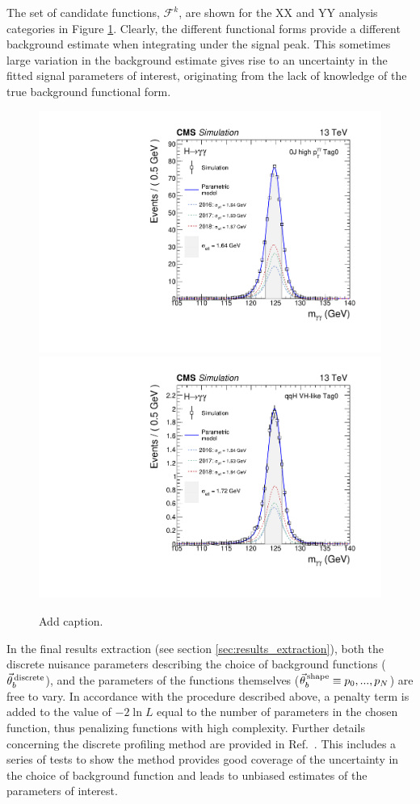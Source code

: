 The set of candidate functions, $\mathcal{F}^k$, are shown for the XX and YY analysis categories in Figure \ref{fig:bkgmodels_category}. Clearly, the different functional forms provide a different background estimate when integrating under the signal peak. This sometimes large variation in the background estimate gives rise to an uncertainty in the fitted signal parameters of interest, originating from the lack of knowledge of the true background functional form.

\begin{figure}[hptb]
  \centering
  \includegraphics[width=.49\textwidth]{Figures/hgg_stats/smodel_RECO_0J_PTH_GT10_Tag0.pdf}
  \hfill
  \includegraphics[width=.49\textwidth]{Figures/hgg_stats/smodel_RECO_VBFTOPO_VHHAD_Tag0.pdf}
  \caption[Signal models for the 0J low \ptH Tag0 and qqH VH-like Tag0 categories]
  {
    Add caption.
  }
  \label{fig:bkgmodels_category}
\end{figure}

In the final results extraction (see section \ref{sec:results_extraction}), both the discrete nuisance parameters describing the choice of background functions ($\vec{\theta}^{\,\rm{discrete}}_{b}$), and the parameters of the functions themselves ($\vec{\theta}^{\,\rm{shape}}_{b} \equiv p_0,...,p_N$) are free to vary. In accordance with the procedure described above, a penalty term is added to the value of $-2\ln{L}$ equal to the number of parameters in the chosen function, thus penalizing functions with high complexity. Further details concerning the discrete profiling method are provided in Ref.~\cite{Dauncey:2014xga}. This includes a series of tests to show the method provides good coverage of the uncertainty in the choice of background function and leads to unbiased estimates of the parameters of interest.

